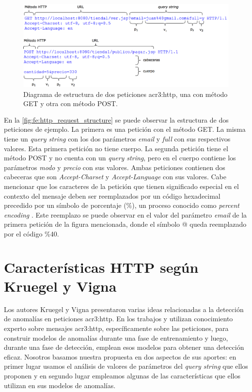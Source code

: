 \begin{figure}[htb]
    \centering
    \includegraphics[width=\linewidth]{images/http-request-structure.png}

    \caption{Diagrama de estructura de dos peticiones \gls{acr3:http},
        una con método GET y otra con método POST.}
    \label{fig:fe:http_request_structure}
\end{figure}

En la \autoref{fig:fe:http_request_structure} se puede observar la estructura
de dos peticiones de ejemplo. La primera es una petición con el método GET.
La misma tiene un \textit{query string} con los dos parámetros \textit{email}
y \textit{full} con sus respectivos valores. Esta primera petición no
tiene cuerpo. La segunda petición tiene el método POST y no cuenta con un
\textit{query string}, pero en el cuerpo contiene los parámetros \textit{modo}
y \textit{precio} con sus valores. Ambas peticiones contienen dos cabeceras
que son \textit{Accept-Charset} y \textit{Accept-Language} con sus valores.
Cabe mencionar que los caracteres de la petición que tienen significado
especial en el contexto del mensaje deben ser reemplazados por un código
hexadecimal precedido por un símbolo de porcentaje (\%), un proceso conocido
como \textit{percent encoding}
\citep{bernerslee2005uri}. %
Este reemplazo se puede observar en el valor del parámetro \textit{email}
de la primera petición de la figura mencionada, donde el símbolo @ queda
reemplazado por el código \%40.


\section{Características HTTP según Kruegel y Vigna}

Los autores Kruegel y Vigna presentaron varias ideas relacionadas a la
detección de anomalías en peticiones \gls{acr3:http}.
En los trabajos \citep{kruegel2003anomaly} y \citep{kruegel2005multi}
utilizan conocimiento experto sobre mensajes \gls{acr3:http},
específicamente sobre las peticiones, para construir modelos de anomalías
durante una fase de entrenamiento y luego, durante una fase de detección,
emplean esos modelos para obtener una detección eficaz.
Nosotros basamos nuestra propuesta en dos aspectos de sus aportes:
en primer lugar usamos el análisis de valores de parámetros del
\textit{query string} que ellos proponen y en segundo lugar empleamos
algunas de las características que ellos utilizan en sus modelos de
anomalías.

